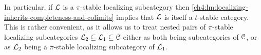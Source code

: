 \begin{remark}
    \label{ch4:rm:pi-stable-implies-t-stable}
    In particular, if $\mathcal{L}$ is a $\pi$-stable localizing subcategory then \cref{ch4:lm:localizing-inherits-completeness-and-colimits} implies that $\mathcal{L}$ is itself a $t$-stable category. This is rather convenient, as it allows us to treat nested pairs of $\pi$-stable localizing subcategories $\mathcal{L}_2 \subseteq \mathcal{L}_1 \subseteq \EuScript{C}$ either as both being subcategories of $\EuScript{C}$, or as $\mathcal{L}_2$ being a $\pi$-stable localizing subcategory of $\mathcal{L}_1$. 
\end{remark}





